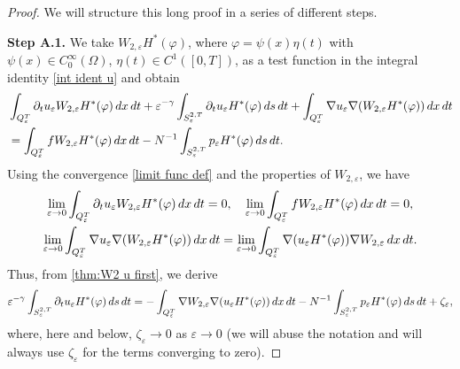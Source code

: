 \documentclass[10pt,a4paper]{amsart}
\numberwithin{equation}{section}
\begin{document}
\begin{proof}
We will structure this long proof in a series of different steps.
\smallskip 

\noindent\textbf{Step A.1.}
 We take $W_{2,\varepsilon }H^{\ast }(\varphi )$, where 
$\varphi =\psi (x)\eta (t)$ with $\psi (x)\in C_0^{\infty }(\Omega )$, 
$\eta (t)\in C^{1}([0,T])$, as a test function in the integral identity 
\eqref{int ident u} and obtain
\begin{equation}
\begin{aligned}
&\int _{Q_{\varepsilon }^{T}}\partial _{t}u_{\varepsilon
}W_{2,\varepsilon }H^{\ast }(\varphi )\,dx\,dt+\varepsilon ^{-\gamma }\int
_{S_{\varepsilon }^{2,T}}\partial _{t}u_{\varepsilon }H^{\ast
}(\varphi )\,ds\,dt+\int _{Q_{\varepsilon }^{T}}\nabla u_{\varepsilon
}\nabla (W_{2,\varepsilon }H^{\ast }(\varphi ))\,dx\,dt    \\
&=\int _{Q_{\varepsilon }^{T}}fW_{2,\varepsilon }H^{\ast }(\varphi ){%
\,dx\,dt}-N^{-1}\int _{S_{\varepsilon }^{2,T}}p_{\varepsilon }H^{\ast
}(\varphi )\,ds\,dt.
\end{aligned} \label{thm:W2 u first}
\end{equation}
Using the convergence \eqref{limit func def} and the properties of $W_{2,\varepsilon }$, 
we have
\begin{gather*}
\lim _{\varepsilon \to 0}\int _{Q_{\varepsilon
}^{T}}\partial _{t}u_{\varepsilon }W_{2,\varepsilon }H^{\ast }(\varphi ){\,dx\,dt%
}=0,\quad \lim _{\varepsilon \to 0}\int
_{Q_{\varepsilon }^{T}}fW_{2,\varepsilon }H^{\ast }(\varphi )\,dx\,dt=0,
\\
\lim _{\varepsilon \to 0}\int _{Q_{\varepsilon
}^{T}}\nabla u_{\varepsilon }\nabla (W_{2,\varepsilon }H^{\ast }(\varphi )){%
\,dx\,dt}=\lim _{\varepsilon \to 0}\int _{Q_{\varepsilon
}^{T}}\nabla (u_{\varepsilon }H^{\ast }(\varphi ))\nabla W_{2,\varepsilon }{%
\,dx\,dt}.
\end{gather*}
Thus, from \eqref{thm:W2 u first}, we derive
\[
\varepsilon ^{-\gamma }\int _{S_{\varepsilon }^{2,T}}\partial
_{t}u_{\varepsilon }H^{\ast }(\varphi )\,ds\,dt=-\int _{Q_{\varepsilon
}^{T}}\nabla W_{2,\varepsilon }\nabla (u_{\varepsilon }H^{\ast }(\varphi )){%
\,dx\,dt}-N^{-1}\int _{S_{\varepsilon }^{2,T}}p_{\varepsilon }H^{\ast
}(\varphi )\,ds\,dt+\zeta _{\varepsilon },
\]
where, here and below, $\zeta _{\varepsilon }\to 0$ as $\varepsilon
\to 0$ (we will abuse the notation and will always use $\zeta
_{\varepsilon }$ for the terms converging to zero).


\end{proof}
\end{document}
